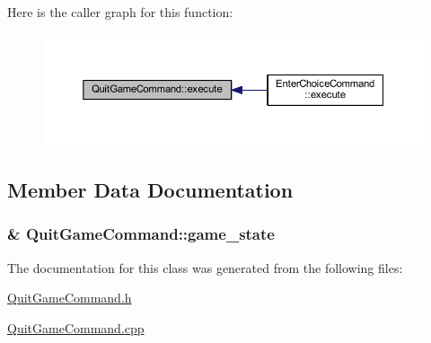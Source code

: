 Here is the caller graph for this function\+:\nopagebreak
\begin{figure}[H]
\begin{center}
\leavevmode
\includegraphics[width=350pt]{class_quit_game_command_ad39d43150a927d7e8b0dd7162eb840eb_icgraph}
\end{center}
\end{figure}




\subsection{Member Data Documentation}
\hypertarget{class_quit_game_command_a5fca8a15889eab4484aaa674f6a1823c}{}
\subsubsection[{game\+\_\+state}]{\& Quit\+Game\+Command\+::game\+\_\+state\hspace{0.3cm}{\ttfamily [private]}}\label{class_quit_game_command_a5fca8a15889eab4484aaa674f6a1823c}


The documentation for this class was generated from the following files\+:\begin{DoxyCompactItemize}
\item 
\hyperlink{_quit_game_command_8h}{Quit\+Game\+Command.\+h}\item 
\hyperlink{_quit_game_command_8cpp}{Quit\+Game\+Command.\+cpp}\end{DoxyCompactItemize}

